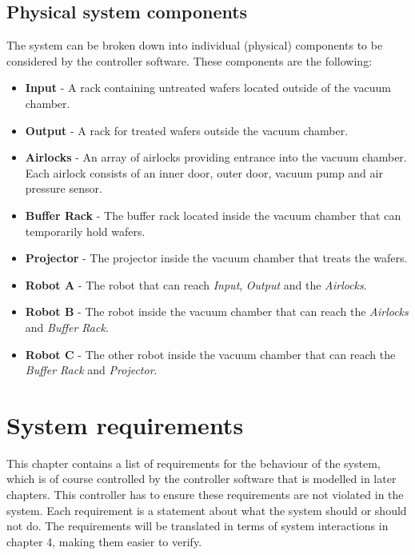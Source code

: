 \documentclass[12pt]{report}
\newcounter{counter}
\begin{document}
	\section{Physical system components}
	The system can be broken down into individual (physical) components to be considered by the controller software. These components are the following:
	\begin{itemize}
	\item \textbf{Input} - A rack containing untreated wafers located outside of the vacuum chamber.
	\item \textbf{Output} - A rack for treated wafers outside the vacuum chamber.
	\item \textbf{Airlocks} - An array of airlocks providing entrance into the vacuum chamber. Each airlock consists of an inner door, outer door, vacuum pump and air pressure sensor.
	\item \textbf{Buffer Rack} - The buffer rack located inside the vacuum chamber that can temporarily hold wafers.
	\item \textbf{Projector} - The projector inside the vacuum chamber that treats the wafers.
	\item \textbf{Robot A} - The robot that can reach \emph{Input}, \emph{Output} and the \emph{Airlocks}.
	\item \textbf{Robot B} - The robot inside the vacuum chamber that can reach the \emph{Airlocks} and \emph{Buffer Rack}.
	\item \textbf{Robot C} - The other robot inside the vacuum chamber that can reach the \emph{Buffer Rack} and \emph{Projector}.
	\end{itemize}
	
	\chapter{System requirements}
	
	\newcommand{\req}[1]{
		\item[\textbf{R\stepcounter{counter}\arabic{counter}}] {#1}
		\hrule
	}
	
	\newcommand{\reqb}[2]{
		\item[\textbf{{#1}}] {#2}
		\hrule
	}
	
	This chapter contains a list of requirements for the behaviour of the system, which is of course controlled by the controller software that is modelled in later chapters. This controller has to ensure these requirements are not violated in the system. Each requirement is a statement about what the system should or should not do. The requirements will be translated in terms of system interactions in chapter 4, making them easier to verify.
\end{document}
